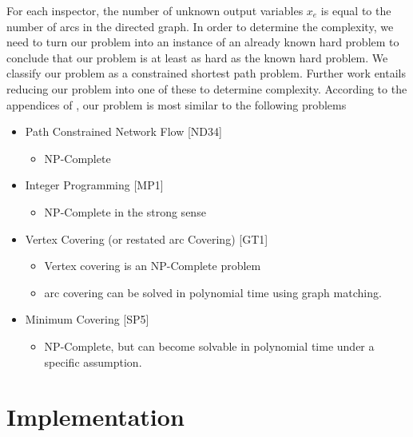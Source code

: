 \documentclass[11pt]{article}
\begin{document}
 \par For each inspector, the number of unknown output variables $x_e$ is equal to the number of arcs in the directed graph. In order to determine the complexity, we need to turn our problem into an instance of an already known hard problem to conclude that our problem is at least as hard as the known hard problem. We classify our problem as a constrained shortest path problem. Further work entails reducing our problem into one of these to determine complexity. According to the appendices of \cite{Garey:1990:CIG:574848}, our problem is most similar to the following problems
\begin{itemize}
    \item Path Constrained Network Flow [ND34]
    \begin{itemize}
        \item NP-Complete
    \end{itemize}
    \item Integer Programming [MP1]
    \begin{itemize}
        \item NP-Complete in the strong sense
    \end{itemize}
    \item Vertex Covering (or restated arc Covering) [GT1]
    \begin{itemize}
        \item Vertex covering is an NP-Complete problem
        \item arc covering can be solved in polynomial time using graph matching.
    \end{itemize}
    \item Minimum Covering [SP5]
    \begin{itemize}
        \item NP-Complete, but can become solvable in polynomial time under a specific assumption. 
    \end{itemize}
\end{itemize}

\section{Implementation}
\end{document}
